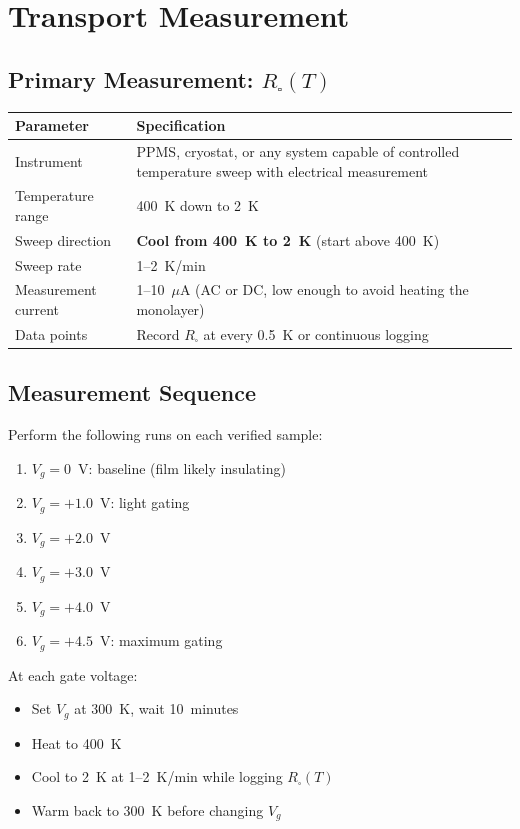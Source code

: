 \documentclass[11pt, a4paper]{article}
\begin{document}
\section{Transport Measurement}

\subsection{Primary Measurement: $R_\square(T)$}

\begin{center}
\begin{tabular}{@{}lp{9cm}@{}}
\toprule
\textbf{Parameter} & \textbf{Specification} \\
\midrule
Instrument & PPMS, cryostat, or any system capable of
  controlled temperature sweep with electrical measurement \\
Temperature range & 400~K down to 2~K \\
Sweep direction & \textbf{Cool from 400~K to 2~K}
  (start above 400~K) \\
Sweep rate & 1--2~K/min \\
Measurement current & 1--10~$\mu$A (AC or DC, low enough to
  avoid heating the monolayer) \\
Data points & Record $R_\square$ at every 0.5~K or continuous
  logging \\
\bottomrule
\end{tabular}
\end{center}

\subsection{Measurement Sequence}

Perform the following runs on each verified sample:

\begin{enumerate}[nosep]
  \item $V_g = 0$~V: baseline (film likely insulating)
  \item $V_g = +1.0$~V: light gating
  \item $V_g = +2.0$~V
  \item $V_g = +3.0$~V
  \item $V_g = +4.0$~V
  \item $V_g = +4.5$~V: maximum gating
\end{enumerate}

At each gate voltage:
\begin{itemize}[nosep]
  \item Set $V_g$ at 300~K, wait 10~minutes
  \item Heat to 400~K
  \item Cool to 2~K at 1--2~K/min while logging $R_\square(T)$
  \item Warm back to 300~K before changing $V_g$
\end{itemize}
\end{document}
